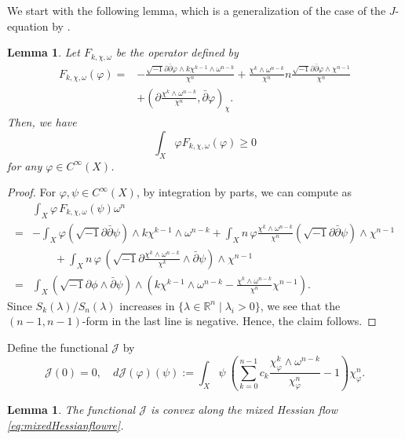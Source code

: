 \documentclass[10pt,a4paper]{amsart}
\numberwithin{equation}{section}
\newtheorem{lem}[equation]{Lemma}
\newcommand{\delb}{\sqrt{-1}\partial\bar{\partial}}
\begin{document}
We start with the following lemma, which is a generalization of the case of the $J$-equation by \cite[Lemma 1]{Hashimoto}.

\begin{lem}\label{lem:F}
    Let $F_{k,\chi,\omega}$ be the operator defined by
    \begin{align*}
        F_{k,\chi,\omega}(\varphi)=&-\frac{\delb \varphi\wedge k\chi^{k-1}\wedge\omega^{n-k}}{\chi^n}+\frac{\chi^k\wedge\omega^{n-k}}{\chi^n}n\frac{\delb\varphi\wedge\chi^{n-1}}{\chi^n}\\
        &+\left(\partial\frac{\chi^k\wedge\omega^{n-k}}{\chi^n},\bar{\partial}\varphi\right)_{\chi}.
    \end{align*}
    Then, we have 
    $$\int_X\varphi F_{k,\chi,\omega}(\varphi)\ge0$$
    for any $\varphi\in C^\infty(X)$.
\end{lem}

\begin{proof}
For $\varphi,\psi\in C^\infty(X)$, by integration by parts, we can compute as
\begin{align*}
& \int_X {\varphi \, F_{k,\chi,\omega} (\psi)} \omega^{n} \\
=&-\int_X \varphi \left({\sqrt{-1} \partial \bar{\partial} \psi} \right)\wedge k\chi^{k-1} \wedge \omega^{n-k} 
+\int_X n \, \varphi \frac{\chi^k\wedge\omega^{n-k}}{\chi^n} \left( \sqrt{-1} \partial \bar{\partial} \psi \right) \wedge \chi^{n-1} \\
& \qquad + \int_X n \, \varphi \, \left( \sqrt{-1} \partial \frac{\chi^k\wedge\omega^{n-k}}{\chi^k} \wedge \bar{\partial}\psi \right) \wedge \chi^{n-1} \\
= & \int_X \left( \sqrt{-1} \partial \phi \wedge \bar{\partial} \psi \right) \wedge \left(k\chi^{k-1} \wedge \omega^{n-k} -\frac{\chi^k\wedge\omega^{n-k}}{\chi^n} \chi^{n-1}\right).
\end{align*}
Since $S_k(\lambda)/S_n(\lambda)$ increases in $\{\lambda\in\mathbb{R}^n\mid \lambda_i>0\}$, we see that the $(n-1,n-1)$-form in the last line is negative. Hence, the claim follows.
\end{proof}

Define the functional $\mathcal{J}$ by
\begin{equation*}
    \mathcal{J}(0)=0,\quad d\mathcal{J}(\varphi)(\psi):=\int_X\psi\ \left(\sum_{k=0}^{n-1}c_k\frac{\chi_{\varphi}^k\wedge\omega^{n-k}}{\chi_{\varphi}^n}-1\right)\chi_{\varphi}^n.
\end{equation*}

\begin{lem}\label{lem:convexalongflow}
    The functional $\mathcal{J}$ is convex along the mixed Hessian flow \eqref{eq:mixedHessianflowre}.
\end{lem}
\end{document}

